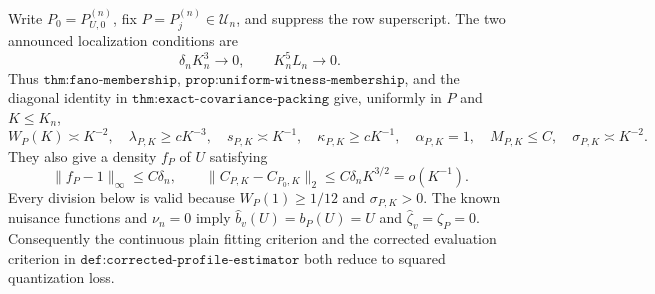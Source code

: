 Write \(P_0=P_{U,0}^{(n)}\), fix \(P=P_j^{(n)}\in\mathcal U_n\), and suppress the row superscript.  The two announced localization conditions are
\[
 \delta_nK_n^3\longrightarrow0,
 \qquad K_n^5L_n\longrightarrow0.                                                \tag{1}
\]
Thus \(\texttt{thm:fano-membership}\), \(\texttt{prop:uniform-witness-membership}\), and the diagonal identity in \(\texttt{thm:exact-covariance-packing}\) give, uniformly in \(P\) and \(K\leq K_n\),
\[
 W_P(K)\asymp K^{-2},\quad \lambda_{P,K}\geq cK^{-3},\quad
 s_{P,K}\asymp K^{-1},\quad \kappa_{P,K}\geq cK^{-1},\quad
 \alpha_{P,K}=1,\quad M_{P,K}\leq C,\quad \sigma_{P,K}\asymp K^{-2}.          \tag{2}
\]
They also give a density \(f_P\) of \(U\) satisfying
\[
 \|f_P-1\|_\infty\leq C\delta_n,\qquad
 \|C_{P,K}-C_{P_0,K}\|_2\leq C\delta_nK^{3/2}=o(K^{-1}).                       \tag{3}
\]
Every division below is valid because \(W_P(1)\geq1/12\) and \(\sigma_{P,K}>0\).  The known nuisance functions and \(\nu_n=0\) imply \(\widehat b_v(U)=b_P(U)=U\) and \(\widehat\zeta_v=\zeta_P=0\).  Consequently the continuous plain fitting criterion and the corrected evaluation criterion in \(\texttt{def:corrected-profile-estimator}\) both reduce to squared quantization loss.

